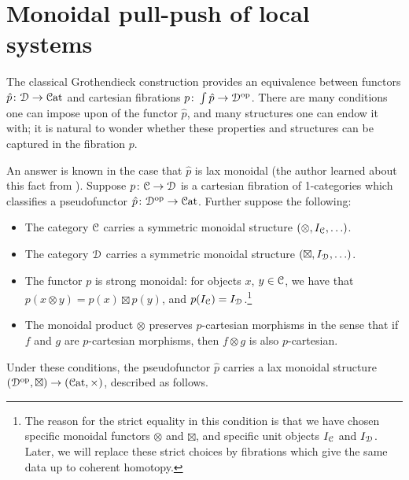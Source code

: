 \documentclass[main.tex]{subfiles}
\begin{document}
\section{Monoidal pull-push of local systems}
\label{sec:the_monoidal_construction}

The classical Grothendieck construction provides an equivalence between functors $\hat{p}\colon \mathcal{D} \to \mathcal{C}\mathrm{at}$ and cartesian fibrations $p\colon \int \hat{p} \to \mathcal{D}^{\mathrm{op}}$. There are many conditions one can impose upon of the functor $\hat{p}$, and many structures one can endow it with; it is natural to wonder whether these properties and structures can be captured in the fibration $p$.

An answer is known in the case that $\hat{p}$ is lax monoidal (the author learned about this fact from \cite{moeller2018monoidal}). Suppose $p\colon \mathcal{C} \to \mathcal{D}$ is a cartesian fibration of 1-categories which classifies a pseudofunctor $\hat{p}\colon \mathcal{D}^{\mathrm{op}} \to \mathcal{C}\mathrm{at}$. Further suppose the following:
\begin{itemize}
  \item The category $\mathcal{C}$ carries a symmetric monoidal structure $(\otimes, I_{\mathcal{C}}, \ldots)$.

  \item The category $\mathcal{D}$ carries a symmetric monoidal structure $(\boxtimes, I_{\mathcal{D}}, \ldots)$.

  \item The functor $p$ is strong monoidal: for objects $x$, $y \in \mathcal{C}$, we have that $p(x \otimes y) = p(x) \boxtimes p(y)$, and $p(I_{\mathcal{C}}) = I_{\mathcal{D}}$.\footnote{The reason for the strict equality in this condition is that we have chosen specific monoidal functors $\otimes$ and $\boxtimes$, and specific unit objects $I_{\mathcal{C}}$ and $I_{\mathcal{D}}$. Later, we will replace these strict choices by fibrations which give the same data up to coherent homotopy.}

  \item The monoidal product $\otimes$ preserves $p$-cartesian morphisms in the sense that if $f$ and $g$ are $p$-cartesian morphisms, then $f \otimes g$ is also $p$-cartesian.
\end{itemize}
Under these conditions, the pseudofunctor $\hat{p}$ carries a lax monoidal structure $(\mathcal{D}^{\mathrm{op}}, \boxtimes) \to (\mathcal{C}\mathrm{at}, \times)$, described as follows. 
\end{document}
